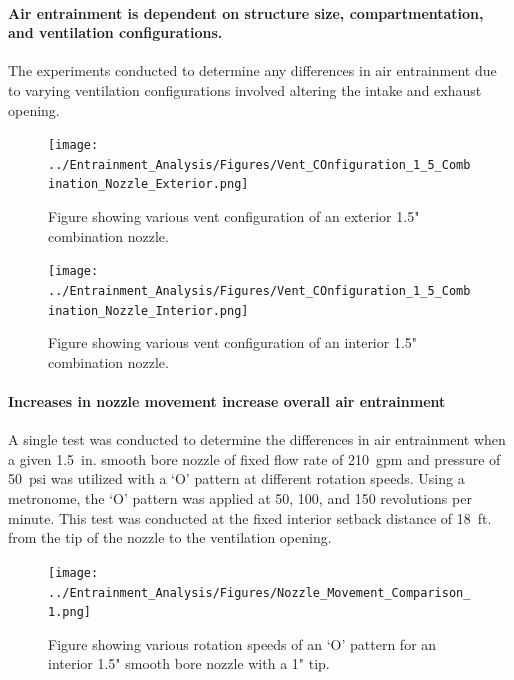 \documentclass{article}
\begin{document}
\clearpage

\paragraph{Air entrainment is dependent on structure size, compartmentation, and ventilation configurations.} \mbox{}

The experiments conducted to determine any differences in air entrainment due to varying ventilation configurations involved altering the intake and exhaust opening. 

\begin{figure}[!ht]
	\centering
	\texttt{[image: ../Entrainment\_Analysis/Figures/Vent\_COnfiguration\_1\_5\_Combination\_Nozzle\_Exterior.png]}
	\caption{Figure showing various vent configuration of an exterior 1.5" combination nozzle.}
	\label{fig:1_5_Exterior_Vent_Configuration_Combination_Comparison}
\end{figure}

\begin{figure}[!ht]
	\centering
	\texttt{[image: ../Entrainment\_Analysis/Figures/Vent\_COnfiguration\_1\_5\_Combination\_Nozzle\_Interior.png]}
	\caption{Figure showing various vent configuration of an interior 1.5" combination nozzle.}
	\label{fig:1_5_Interior_Vent_Configuration_Combination_Comparison}
\end{figure}

\clearpage

\paragraph{Increases in nozzle movement increase overall air entrainment}

A single test was conducted to determine the differences in air entrainment when a given 1.5~in. smooth bore nozzle of fixed flow rate of 210~gpm and pressure of 50~psi was utilized with a `O' pattern at different rotation speeds. Using a metronome, the `O' pattern was applied at 50, 100, and 150 revolutions per minute. This test was conducted at the fixed interior setback distance of 18~ft. from the tip of the nozzle to the ventilation opening.

\begin{figure}[!ht]
	\centering
	\texttt{[image: ../Entrainment\_Analysis/Figures/Nozzle\_Movement\_Comparison\_1.png]}
	\caption{Figure showing various rotation speeds of an `O' pattern for an interior 1.5" smooth bore nozzle with a 1" tip.}
	\label{fig:1_5_Interior_Nozzle_Movement_RotationSpeed_Comparison}
\end{figure}
\end{document}
